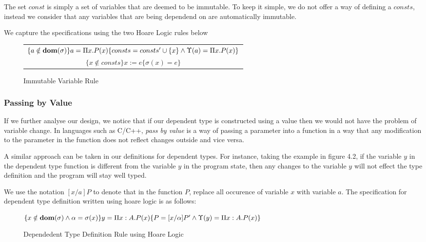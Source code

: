\documentclass[a4paper,12pt]{report}
\begin{document}
The set $const$ is simply a set of variables that are deemed to be immutable. To 
keep it simple, we do not offer a way of defining a $consts$, instead we 
consider that any variables that are being dependend on are automatically 
immutable. 

\par
We capture the specifications using the two Hoare Logic rules below

\begin{figure}[H]
  \begin{center}
    
    \begin{tabular}{c}
      $\{a \notin \text{\textbf{dom}}(\sigma)\}a = \Pi x. P(x)\{consts = consts' \cup \{x\} 
      \wedge \Upsilon(a) = \Pi x. P(x)\}$ & \\  
      $\{x \notin consts\}x := e\{\sigma(x) = e\}$
    \end{tabular}
  \end{center}
  \caption{Immutable Variable Rule}
\end{figure}

\subsubsection{Passing by Value}

If we further analyse our design, we notice that if our dependent type is 
constructed using a value then we would not have the problem of variable change. 
In languages such as C/C++, \textit{pass by value} \cite{pbv} is a way of 
passing a parameter into a function in a way that any modification to the 
parameter in the function does not reflect changes outside and vice versa. 

\par
A similar approach can be taken in our definitions for dependent types. For 
instance, taking the example in figure 4.2, if the variable $y$ in the dependent 
type function is different from the variable $y$ in the program state, then any 
changes to the variable $y$ will not effect the type definition and the program 
will stay well typed. 

\par 
We use the notation $[x/a]P$ to denote that in the function $P$, replace all 
occurence of variable $x$ with variable $a$. 
The specification for dependent type definition written using hoare logic is as follows: 

\begin{figure}[H]
  \begin{center}
    \small$\{x \notin \text{\textbf{dom}}(\sigma) \wedge \alpha = \sigma(x)\}
    y = \Pi x : A. P(x)\{P =  [x/\alpha]P' \wedge \Upsilon(y) =  \Pi x : A. P(x)\}$ 
    \normalsize
  \end{center}
  \caption{Dependedent Type Definition Rule using Hoare Logic}
\end{figure}
\end{document}
